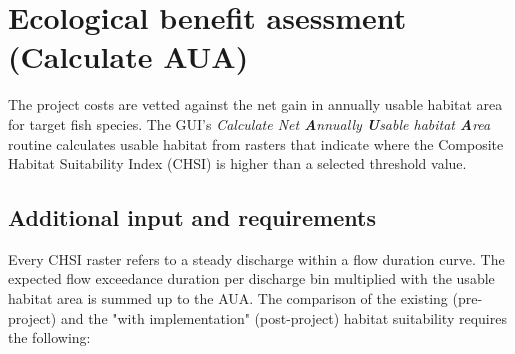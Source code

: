 \section{Ecological benefit asessment (Calculate AUA)}\label{sec:pmaua}

The project costs are vetted against the net gain in annually usable habitat area for target fish species. The GUI's \emph{Calculate Net \textbf{A}nnually \textbf{U}sable habitat \textbf{A}rea} routine calculates usable habitat from rasters that indicate where the Composite Habitat Suitability Index (CHSI) is higher than a selected threshold value.

\subsection{Additional input and requirements}
Every CHSI raster refers to a steady discharge within a flow duration curve. The expected flow exceedance duration per discharge bin multiplied with the usable habitat area is summed up to the AUA. The comparison of the existing (pre-project) and the "with implementation" (post-project) habitat suitability requires the following:


